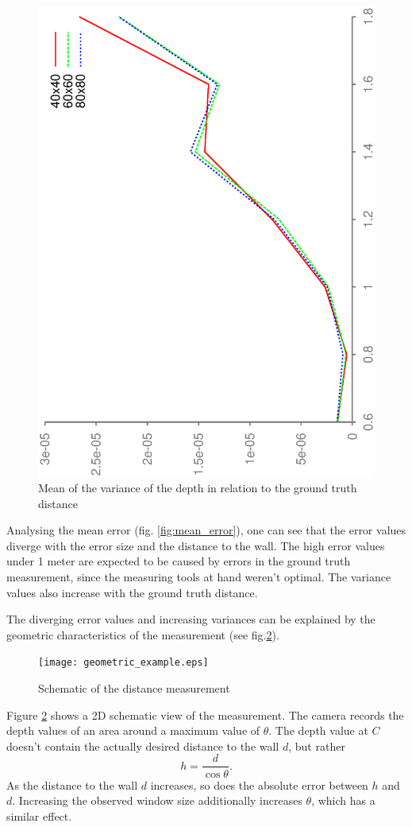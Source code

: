 \documentclass[DIV12,a4paper]{scrartcl}
\begin{document}
\begin{figure}[h!tbp]
  \centering
  \includegraphics[height=0.8\textwidth,angle=270]{figures/mean_org_variance.eps}
  \caption{Mean of the variance of the depth in relation to the ground truth distance}
  \label{fig:variance}
\end{figure}
Analysing the mean error (fig. \ref{fig:mean_error}), one can see that the error values diverge with the error size and the distance to the wall. The high error values under 1 meter are expected to be caused by errors in the ground truth measurement, since the measuring tools at hand weren't optimal. The variance values also increase with the ground truth distance.\par
 The diverging error values and increasing variances can be explained by the geometric characteristics of the measurement (see fig.\ref{fig:geometric_representation}).
\begin{figure}[!ht]
  \centering
  \texttt{[image: geometric\_example.eps]}
  \caption{Schematic of the distance measurement}
  \label{fig:geometric_representation}
\end{figure}\par
Figure \ref{fig:geometric_representation} shows a 2D schematic view of the measurement. The camera records the depth values of an area around a maximum value of $\theta$. The depth value at $C$ doesn't contain the actually desired distance to the wall $d$, but rather\[ h=\frac{d}{\cos\theta}.\]
As the distance to the wall $d$ increases, so does the absolute error between $h$ and $d$. Increasing the observed window size additionally increases $\theta$, which has a similar effect.
\end{document}
